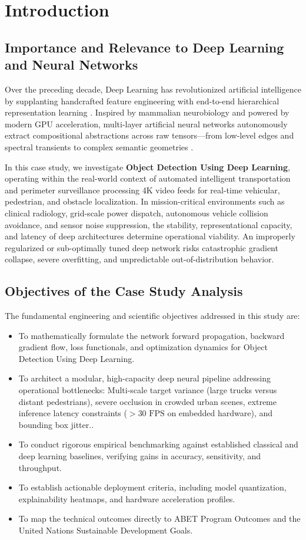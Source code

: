 \section{Introduction}

\subsection{Importance and Relevance to Deep Learning and Neural Networks}
Over the preceding decade, Deep Learning has revolutionized artificial intelligence by supplanting handcrafted feature engineering with end-to-end hierarchical representation learning \cite{lecun2015deep}. Inspired by mammalian neurobiology and powered by modern GPU acceleration, multi-layer artificial neural networks autonomously extract compositional abstractions across raw tensors---from low-level edges and spectral transients to complex semantic geometries \cite{goodfellow2016deep}.

In this case study, we investigate \textbf{Object Detection Using Deep Learning}, operating within the real-world context of automated intelligent transportation and perimeter surveillance processing 4K video feeds for real-time vehicular, pedestrian, and obstacle localization. In mission-critical environments such as clinical radiology, grid-scale power dispatch, autonomous vehicle collision avoidance, and sensor noise suppression, the stability, representational capacity, and latency of deep architectures determine operational viability. An improperly regularized or sub-optimally tuned deep network risks catastrophic gradient collapse, severe overfitting, and unpredictable out-of-distribution behavior.

\subsection{Objectives of the Case Study Analysis}
The fundamental engineering and scientific objectives addressed in this study are:
\begin{itemize}
  \item To mathematically formulate the network forward propagation, backward gradient flow, loss functionals, and optimization dynamics for Object Detection Using Deep Learning.
  \item To architect a modular, high-capacity deep neural pipeline addressing operational bottlenecks: Multi-scale target variance (large trucks versus distant pedestrians), severe occlusion in crowded urban scenes, extreme inference latency constraints ($>30\text{ FPS}$ on embedded hardware), and bounding box jitter..
  \item To conduct rigorous empirical benchmarking against established classical and deep learning baselines, verifying gains in accuracy, sensitivity, and throughput.
  \item To establish actionable deployment criteria, including model quantization, explainability heatmaps, and hardware acceleration profiles.
  \item To map the technical outcomes directly to ABET Program Outcomes and the United Nations Sustainable Development Goals.
\end{itemize}

